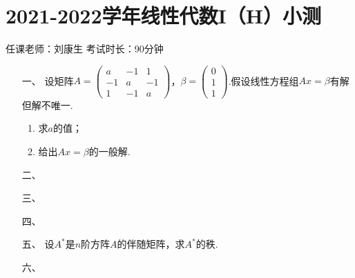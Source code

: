 \section*{2021-2022学年线性代数I（H）小测}

\begin{center}
    任课老师：刘康生\hspace{4em} 考试时长：90分钟
\end{center}
\begin{enumerate}
	\item[一、] 设矩阵$A=\begin{pmatrix}
        a & -1 & 1 \\ -1 & a & -1 \\ 1 & -1 & a
    \end{pmatrix}$，$\beta=\begin{pmatrix}
        0 \\ 1 \\ 1
    \end{pmatrix}$.假设线性方程组$Ax=\beta$有解但解不唯一.
    \begin{enumerate}[label=(\arabic*)]
        \item 求$a$的值；
        \item 给出$Ax=\beta$的一般解.
    \end{enumerate}
	\item[二、]
	\item[三、]
	\item[四、]
	\item[五、]设$A^*$是$n$阶方阵$A$的伴随矩阵，求$A^*$的秩.
	\item[六、]
\end{enumerate}
\newpage
